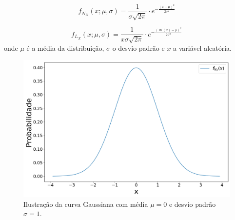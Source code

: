  
\begin{equation}
{\displaystyle f_{N_X}(x;\mu,\sigma) = \frac{1}{\sigma\sqrt{2\pi}}\cdot e^{-\frac{(x-\mu)^2}{2\sigma^2}}}
\label{equ:Normal}
\end{equation}

\begin{equation}
	{\displaystyle f_{L_X}(x;\mu ,\sigma )={\frac {1}{x\sigma {\sqrt {2\pi }}}}\cdot e^ {-\frac {\left(\ln(x)-\mu \right)^{2}}{2\sigma ^{2}}}}
	\label{eq:Lognormal}
\end{equation}
onde $\mu$ é a média da distribuição, $\sigma$ o desvio padrão e $x$ a variável aleatória.

\begin{figure}[H]
	\centering
	\includegraphics[width=0.6\linewidth]{./figuras/Normal}
	\caption{Ilustração da curva Gaussiana com média $\mu = 0$ e desvio padrão $\sigma = 1$.}
	\label{fig:Gaussiana}
\end{figure}

